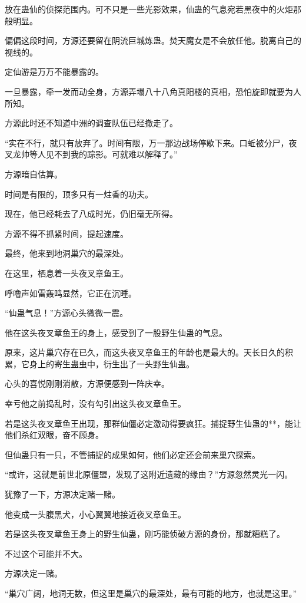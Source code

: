 \begin{this_body}
放在蛊仙的侦探范围内。可不只是一些光影效果，仙蛊的气息宛若黑夜中的火炬那般明显。

偏偏这段时间，方源还要留在阴流巨城炼蛊。焚天魔女是不会放任他。脱离自己的视线的。

定仙游是万万不能暴露的。

一旦暴露，牵一发而动全身，方源弄塌八十八角真阳楼的真相，恐怕旋即就要为人所知。

方源此时还不知道中洲的调查队伍已经撤走了。

“实在不行，就只有放弃了。时间有限，万一那边战场停歇下来。口蚯被分尸，夜叉龙帅等人见不到我的踪影。可就难以解释了。”

方源暗自估算。

时间是有限的，顶多只有一炷香的功夫。

现在，他已经耗去了八成时光，仍旧毫无所得。

方源不得不抓紧时间，提起速度。

最终，他来到地洞巢穴的最深处。

在这里，栖息着一头夜叉章鱼王。

呼噜声如雷轰鸣显然，它正在沉睡。

“仙蛊气息！”方源心头微微一震。

他在这头夜叉章鱼王的身上，感受到了一股野生仙蛊的气息。

原来，这片巢穴存在已久，而这头夜叉章鱼王的年龄也是最大的。天长日久的积累，它身上的寄生蛊虫中，衍生出了一头野生仙蛊。

心头的喜悦刚刚消散，方源便感到一阵庆幸。

幸亏他之前捣乱时，没有勾引出这头夜叉章鱼王。

若是这头夜叉章鱼王出现，那群仙僵必定激动得要疯狂。捕捉野生仙蛊的**，能让他们杀红双眼，奋不顾身。

但仙蛊只有一只，不管捕捉的成果如何，他们必定还会前来巢穴探索。

“或许，这就是前世北原僵盟，发现了这附近遗藏的缘由？”方源忽然灵光一闪。

犹豫了一下，方源决定赌一赌。

他变成一头腹黑犬，小心翼翼地接近夜叉章鱼王。

若是这头夜叉章鱼王身上的野生仙蛊，刚巧能侦破方源的身份，那就糟糕了。

不过这个可能并不大。

方源决定一赌。

“巢穴广阔，地洞无数，但这里是巢穴的最深处，最有可能的地方，也就是这里。”


\end{this_body}
